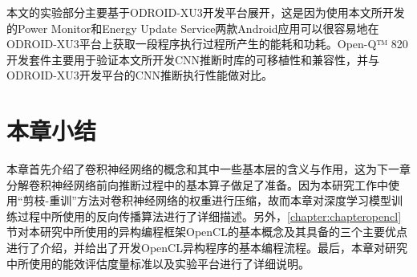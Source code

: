 本文的实验部分主要基于ODROID-XU3开发平台展开，这是因为使用本文所开发的Power Monitor和Energy Update Service两款Android应用可以很容易地在ODROID-XU3平台上获取一段程序执行过程所产生的能耗和功耗。Open-Q™ 820开发套件主要用于验证本文所开发CNN推断时库的可移植性和兼容性，并与ODROID-XU3开发平台的CNN推断执行性能做对比。

\section{本章小结}

本章首先介绍了卷积神经网络的概念和其中一些基本层的含义与作用，这为下一章分解卷积神经网络前向推断过程中的基本算子做足了准备。因为本研究工作中使用“剪枝-重训”方法对卷积神经网络的权重进行压缩，故而本章对深度学习模型训练过程中所使用的反向传播算法进行了详细描述。另外，\ref{chapter:chapteropencl}节对本研究中所使用的异构编程框架OpenCL的基本概念及其具备的三个主要优点进行了介绍，并给出了开发OpenCL异构程序的基本编程流程。最后，本章对研究中所使用的能效评估度量标准以及实验平台进行了详细说明。

\cleardoublepage 